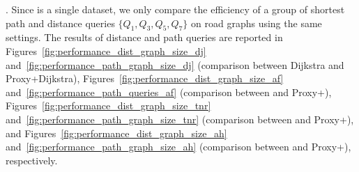 


.
%
Since \dblpone is a single dataset, we only compare the efficiency of a group of shortest path and distance queries $\{Q_1, Q_3, Q_5, Q_7\}$  on road graphs using the same settings.
The results of distance and path queries are reported in
Figures~\ref{fig:performance_dist_graph_size_dj} and~\ref{fig:performance_path_graph_size_dj} (comparison between Dijkstra and Proxy+Dijkstra), Figures~\ref{fig:performance_dist_graph_size_af} and~\ref{fig:performance_path_queries_af} (comparison between \arcflag and Proxy+\arcflag), Figures~\ref{fig:performance_dist_graph_size_tnr} and~\ref{fig:performance_path_graph_size_tnr} (comparison between \tnr and Proxy+\tnr), and Figures~\ref{fig:performance_dist_graph_size_ah} and~\ref{fig:performance_path_graph_size_ah} (comparison between \ah and Proxy+\ah), respectively.


